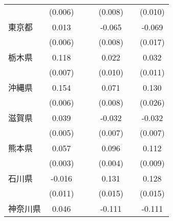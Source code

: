 \begin{table}[htbp]
\begin{tabular}{l*{6}{c}}
                    &     (0.006)         &                     &                     &     (0.008)         &                     &     (0.010)         \\
東京都              &       0.013\sym{*}  &                     &                     &      -0.065\sym{***}&                     &      -0.069\sym{***}\\
                    &     (0.006)         &                     &                     &     (0.008)         &                     &     (0.017)         \\
栃木県              &       0.118\sym{***}&                     &                     &       0.022\sym{*}  &                     &       0.032\sym{**} \\
                    &     (0.007)         &                     &                     &     (0.010)         &                     &     (0.011)         \\
沖縄県              &       0.154\sym{***}&                     &                     &       0.071\sym{***}&                     &       0.130\sym{***}\\
                    &     (0.006)         &                     &                     &     (0.008)         &                     &     (0.026)         \\
滋賀県              &       0.039\sym{***}&                     &                     &      -0.032\sym{***}&                     &      -0.032\sym{***}\\
                    &     (0.005)         &                     &                     &     (0.007)         &                     &     (0.007)         \\
熊本県              &       0.057\sym{***}&                     &                     &       0.096\sym{***}&                     &       0.112\sym{***}\\
                    &     (0.003)         &                     &                     &     (0.004)         &                     &     (0.009)         \\
石川県              &      -0.016         &                     &                     &       0.131\sym{***}&                     &       0.128\sym{***}\\
                    &     (0.011)         &                     &                     &     (0.015)         &                     &     (0.015)         \\
神奈川県            &       0.046\sym{***}&                     &                     &      -0.111\sym{***}&                     &      -0.111\sym{***}\\

\end{tabular}
\end{table}
